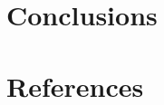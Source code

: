 \documentclass[a4paper]{report}
\begin{document}
\chapter{Conclusions}
\label{chap:conclusions}

    


\newpage

\chapter*{References}
\begin{multicols}{2}
    \small
    \renewcommand{\bibsection}{ \vspace{-\baselineskip}\vspace{-1.1mm} }
    
    
\end{multicols}
\end{document}
